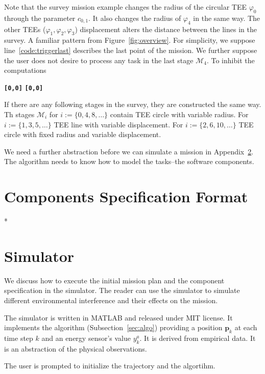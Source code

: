 \documentclass[letterpaper,10pt,conference]{ieeeconf}
\theoremstyle{definition}
\begin{document}
Note that the survey mission example changes the radius of the circular TEE $\varphi_0$ through the parameter $c_{0,1}$. It also changes the radius of $\varphi_4$ in the same way. The other TEEs ($\varphi_1,\varphi_2,\varphi_3$) displacement alters the distance between the lines in the survey. A familiar pattern from Figure~\ref{fig:overview}. For simplicity, we suppose line~\ref{code:triggerlast} describes the last point of the mission. We further suppose the user does not desire to process any task in the last stage $\mathcal{M}_4$. To inhibit the computations
\begin{algorithmic}[1]
  \State\textbf{\texttt{[0,0]}}
  \State\textbf{\texttt{[0,0]}}
\end{algorithmic}

If there are any following stages in the survey, they are constructed the same way. Th stages $\mathcal{M}_i$ for $i:=\{0,4,8,\dots\}$ contain TEE circle with variable radius. For $i:=\{1,3,5,\dots\}$ TEE line with variable displacement. For $i:=\{2,6,10,\dots\}$ TEE circle with fixed radius and variable displacement.

We need a further abstraction before we can simulate a mission in Appendix~\ref{app:simulator}. The algorithm needs to know how to model the tasks--the software components.

\section{Components Specification Format}

*

\section{Simulator}
\label{app:simulator}

We discuss how to execute the initial mission plan and the component specification in the simulator. The reader can use the simulator to simulate different environmental interference and their effects on the mission.

The simulator is written in MATLAB and released under MIT license. It implements the algorithm (Subsection~\ref{sec:algo}) providing a position $\mathbf{p}_k$ at each time step $k$ and an energy sensor's value $y_k^a$. It is derived from empirical data. It is an abstraction of the physical observations. 

The user is prompted to initialize the trajectory and the algortihm.
\end{document}

